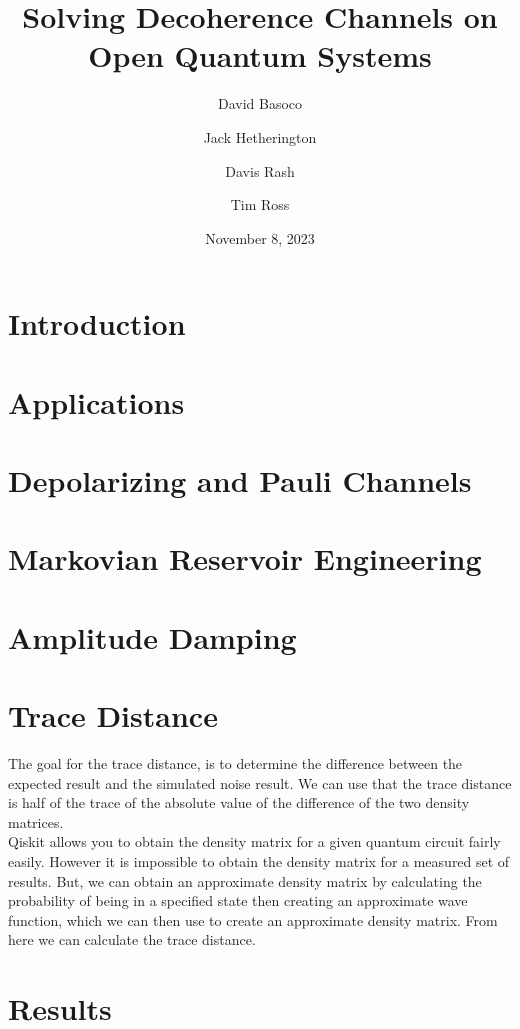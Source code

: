 \documentclass[12pt]{article}
\title{Solving Decoherence Channels on Open Quantum Systems}
\author{David Basoco \and Jack Hetherington \and Davis Rash \and Tim Ross}
\date{November 8, 2023}
\begin{document}
  \maketitle

  \section{Introduction}
  \blindtext

  \section{Applications}
  \blindtext

  \section{Depolarizing and Pauli Channels}
  \blindtext

  \section{Markovian Reservoir Engineering}
  \blindtext

  \section{Amplitude Damping}
  \blindtext

  \section{Trace Distance}
        The goal for the trace distance, is to determine the difference between the expected result and the simulated noise result. We can use that the trace distance is half of the trace of the absolute value of the difference of the two density matrices. \\
        Qiskit allows you to obtain the density matrix for a given quantum circuit fairly easily. However it is impossible to obtain the density matrix for a measured set of results. But, we can obtain an approximate density matrix by calculating the probability of being in a specified state then creating an approximate wave function, which we can then use to create an approximate density matrix. From here we can calculate the trace distance.  

  \section{Results}
\end{document}
